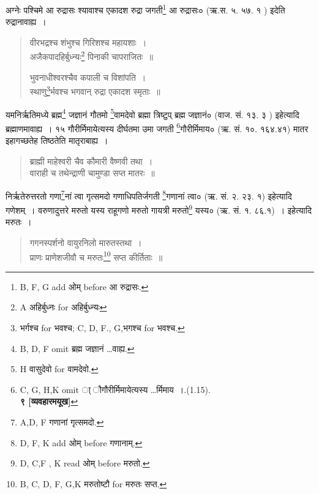 \documentclass[11pt, openany]{book}
\begin{document}
अग्नेः पश्चिमे आ रुद्रासः श्यावाश्च एकादश रुद्रा जगती\renewcommand{\thefootnote}{3}\footnote{B, F, G add ओम् before आ रुद्रासः.} आ रुद्रासः० (ऋ.स. ५. ५७. १ ) इदेति रुद्रानावाह्य~। 

\begin{quote}
{\vy वीरभद्रश्च शंभुश्च गिरिशश्च महायशाः~।\\
अजैकपादहिर्बुध्न्यः\renewcommand{\thefootnote}{4}\footnote{A अहिर्बुध्नः for अहिर्बुध्न्यः\textendash } पिनाकी चापराजितः~॥

भुवनाधीश्वरश्चैव कपाली च विशांपति~।\\
स्थाणु\renewcommand{\thefootnote}{5}\footnote{भर्गश्च for भवश्च; C, D, F., G,भगश्च for भवश्च.}र्भवश्च भगवान् रुद्रा एकादश स्मृताः~॥}
\end{quote}

यमनिर्ऋतिमध्ये ब्रह्म\renewcommand{\thefootnote}{6}\footnote{B, D, F omit ब्रह्म जज्ञानं \ldots वाह्य.} जज्ञानं गौतमो \renewcommand{\thefootnote}{7}\footnote{H वासुदेवो for वामदेवो.}वामदेवो ब्रह्मा त्रिष्टुप् ब्रह्म जज्ञानं० (वाज. सं. १३. ३ ) इहेत्यादि ब्रह्माणमावाह्य~। १५ गौरीर्मिमायेत्यस्य दीर्घतमा उमा जगती \renewcommand{\thefootnote}{8}\footnote{C, G, H,K omit ा् ौगौरीर्मिमायेत्यस्य \ldots र्मिमाय~।.(1.15). \\ \indent \textbf{९ [व्यवहारमयूख]}}गौरीर्मिमाय० (ऋ. सं. १०. १६४.४१) मातर इहागच्छतेह तिष्ठतेति मातृराबाह्य~।

\begin{quote}
{\vy ब्राह्मी माहेश्वरी चैव कौमारी वैष्णवी तथा~।\\
वाराही च तथेन्द्राणी चामुण्डा सप्त मातरः~॥}
\end{quote}

\newpage

\noindent
निर्ऋतेरुत्तरतो गणा\renewcommand{\thefootnote}{1}\footnote{A,D, F गणानां गृत्समदो.}नां त्वा गृत्समदो गणाधिपतिर्जगती \renewcommand{\thefootnote}{2}\footnote{D, F, K add ओम् before गणानाम्.}गणानां त्वा० (ऋ. सं. २. २३. १) इहेत्यादि गणेशम्~। वरुणादुत्तरे मरुतो यस्य राहूगणो मरुतो गायत्री मरुतो\renewcommand{\thefootnote}{3}\footnote{D, C,F , K read ओम् before मरुतो.} यस्य० (ऋ. सं. १. ८६.१)~। इहेत्यादि मरुतः~।

\begin{quote}
{\vy गगनस्पर्शनो वायुरनिलो मारुतस्तथा~।\\
प्राणः प्राणेशजीवौ च मरुतः\renewcommand{\thefootnote}{4}\footnote{B, C, D, F, G,K मरुतोष्टौ for मरुतः सप्त.} सप्त कीर्तिताः~॥}
\end{quote}
\end{document}
